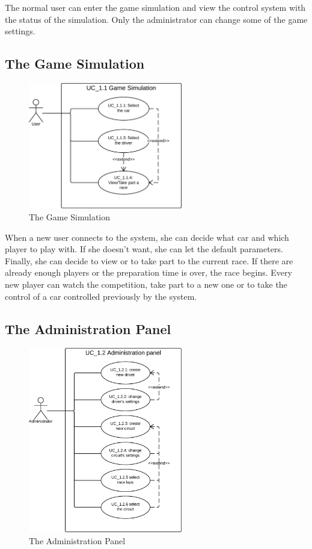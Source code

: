 The normal user can enter the game simulation and view the control system with the status of the simulation. Only the administrator can change some of the game settings.

\subsection{The Game Simulation}

\begin{figure}[H]
\centering %
\includegraphics[width=0.6\textwidth]{./img/UML/GameSimulation.png}
\caption{The Game Simulation}
\label{fig:GameSimulation}
\end{figure}

When a new user connects to the system, she can decide what car and which player to play with. If she doesn't want, she can let the default parameters. Finally, she can decide to view or to take part to the current race. If there are already enough players or the preparation time is over, the race begins. Every new player can watch the competition, take part to a new one or to take the control of a car controlled previously by the system.

\subsection{The Administration Panel}

\begin{figure}[H]
\centering %
\includegraphics[width=0.6\textwidth]{./img/UML/AdministrationPanel.png}
\caption{The Administration Panel}
\label{fig:AdministrationPanel}
\end{figure}

